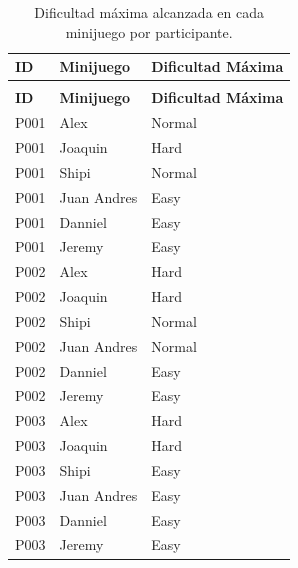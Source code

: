 \begin{longtable}{
    |
    >{\centering\arraybackslash}p{4.5cm}|
    >{\centering\arraybackslash}p{4.5cm}|
    >{\centering\arraybackslash}p{4.5cm}|
}

    \caption{Dificultad máxima alcanzada en cada minijuego por participante.}
    \label{tab:maxDificultad}\\
    \hline

    \textbf{ID} &
    \textbf{Minijuego} &
    \textbf{Dificultad Máxima}  \\ \hline

    \endfirsthead

    \multicolumn{3}{c}{
        Cuadro \thetable{} -- Continuación
    } \\
    \hline

    \textbf{ID} &
    \textbf{Minijuego} &
    \textbf{Dificultad Máxima}  \\ \hline

    \endhead

    P001 & Alex        & Normal \\ \hline
    P001 & Joaquin     & Hard \\ \hline
    P001 & Shipi       & Normal \\ \hline
    P001 & Juan Andres & Easy \\ \hline
    P001 & Danniel     & Easy \\ \hline
    P001 & Jeremy      & Easy \\ \hline

    P002 & Alex        & Hard \\ \hline
    P002 & Joaquin     & Hard \\ \hline
    P002 & Shipi       & Normal \\ \hline
    P002 & Juan Andres & Normal \\ \hline
    P002 & Danniel     & Easy \\ \hline
    P002 & Jeremy      & Easy \\ \hline

    P003 & Alex        & Hard \\ \hline
    P003 & Joaquin     & Hard \\ \hline
    P003 & Shipi       & Easy \\ \hline
    P003 & Juan Andres & Easy \\ \hline
    P003 & Danniel     & Easy \\ \hline
    P003 & Jeremy      & Easy \\ \hline


\end{longtable}
